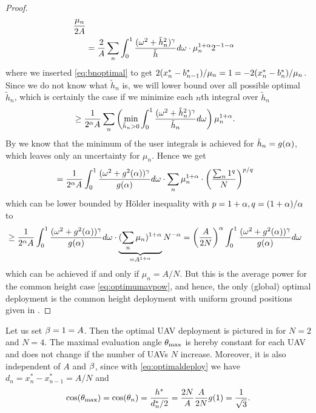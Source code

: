 \documentclass[smallabstract,smallcaptions]{dccpaper}
\begin{document}
\begin{proof}
\begin{align}
    \frac{\mu_n}{2A}\notag\\
    &=\frac{2}{A}\sum_n \int_0^1 \frac{(\omega^2+\tilde{h}^2_n)^{\gamma}}{\tilde{h}}d \omega \cdot \mu_n^{1+\alpha} 2^{-1-\alpha}
  \end{align}
  where we inserted \eqref{eq:bnoptimal} to get $2(x^{*}_n-b_{n-1}^*)/\mu_n=1=-2(x^{*}_n-b_{n}^*)/\mu_n$.
  Since we do not know what $\tilde{h}_n$ is, we will lower bound over all possible optimal $\tilde{h}_n$, which is
  certainly the case if we minimize each $n$th integral over $\tilde{h}_n$
  \begin{align}
    &\geq\frac{1}{2^{\alpha}A}\sum_n \left(\min_{\tilde{h}_n>0}\int_0^1 \frac{(\omega^2+\tilde{h}^2_n)^{\gamma}}{\tilde{h}_n}d \omega\right)
    \mu_n^{1+\alpha}.
\end{align}
%
By  we know that the minimum of the user integrals is  achieved for $\tilde{h}_n=g(\alpha)$, which leaves
only an uncertainty for $\mu_n$. Hence we get
%
\begin{align}
  &=\frac{1}{2^{\alpha}A} \int_0^1 \frac{(\omega^2+g^2(\alpha))^{\gamma}}{g(\alpha)}d\omega\cdot \sum_n \mu_n^{1+\alpha}\cdot \left(\frac{\sum_n
  1^q}{N}\right)^{p/q}
\end{align}
%
which can be lower bounded by Hölder inequality with $p=1+\alpha, q=(1+\alpha)/\alpha$ to
%
\begin{align}
  &\geq\frac{1}{2^{\alpha}A} 
  \int_0^1 \frac{(\omega^2+g^2(\alpha))^{\gamma}}{g(\alpha)}d\omega\cdot\underbrace{ (\sum_n
    \mu_n)^{1+\alpha}}_{=A^{1+\alpha}} N^{-\alpha}
    =  \left(\frac{A}{2N}\right)^{\alpha}  \int_0^1 \frac{(\omega^2+g^2(\alpha))^{\gamma}}{g(\alpha)}d\omega\notag
\end{align}
%
which can be achieved if and only if $\mu_n=A/N$. But this is the average power for the common height case
\eqref{eq:optimumavpow}, and hence, the only (global) optimal deployment is  the common height deployment with uniform
ground positions given in . 
%
\end{proof}
\fi %
\color{black}

Let us set $\beta=1=A$. Then the optimal UAV deployment is pictured in  for $N=2$ and $N=4$. The
maximal evaluation angle $\theta_{\text{max}}$ is hereby constant for each UAV and does not change if the number of UAVs
$N$ increase.
Moreover, it is also independent of $A$ and $\beta$, since with \eqref{eq:optimaldeploy} we have
$d_n=x^*_n-x^*_{n-1}=A/N$ and
%
\begin{align}
  \cos(\theta_{\text{max}})=\cos(\theta_n)= \frac{h^*}{d^*_n/2}= \frac{2N}{A}\frac{A}{2N}   g(1)= \frac{1}{\sqrt{3}}.
\end{align}
\end{document}
